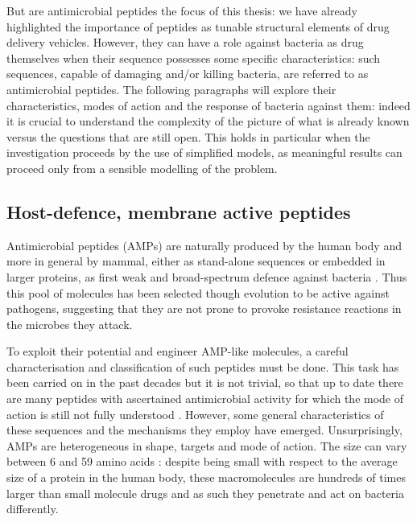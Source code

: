 But are antimicrobial peptides the focus of this thesis: we have already highlighted the importance of peptides as tunable structural elements of drug delivery vehicles. However, they can have a role against bacteria as drug themselves when their sequence possesses some specific characteristics: such sequences, capable of damaging and/or killing bacteria, are referred to as antimicrobial peptides. The following paragraphs will explore their characteristics, modes of action and the response of bacteria against them: indeed it is crucial to understand the complexity of the picture of what is already known versus the questions that are still open. This holds in particular when the investigation proceeds by the use of simplified models, as meaningful results can proceed only from a sensible  modelling of the problem.

\subsection{Host-defence, membrane active peptides}
Antimicrobial peptides (AMPs) are naturally produced by the human body and more in general by mammal, either as stand-alone sequences or embedded in larger proteins, as first weak and broad-spectrum defence against bacteria \cite{Nguyen2011,Bahar2013,Mahlapuu2016,Zhang2016}.
%
Thus this pool of molecules has been selected though evolution to be active against pathogens, suggesting that they are not prone to provoke resistance reactions in the microbes they attack.

To exploit their potential and engineer AMP-like molecules, a careful characterisation and classification of such peptides must be done. This task has been carried on in the past decades but it is not trivial, so that up to date there are many peptides with ascertained antimicrobial activity for which the mode of action is still not fully understood \cite{Ebbensgaard2015PLOS???}. However, some general characteristics of these sequences and the mechanisms they employ have emerged.
%
Unsurprisingly, AMPs are heterogeneous in shape, targets and mode of action. The size can vary between 6 and 59 amino acids \cite{Brogden2005}: despite being small with respect to the average size of a protein in the human body, these macromolecules are hundreds of times larger than small molecule drugs and as such they penetrate and act on bacteria differently.

